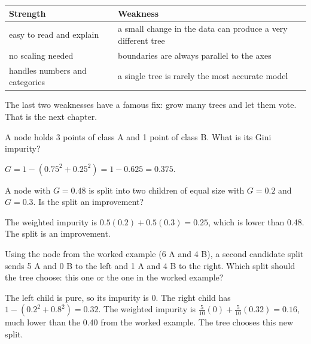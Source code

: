 \begin{center}
\begin{tabular}{>{\raggedright\arraybackslash}p{4.4cm} >{\raggedright\arraybackslash}p{7.6cm}}
\textbf{Strength} & \textbf{Weakness} \\
\hline
easy to read and explain & a small change in the data can produce a very different tree \\
no scaling needed & boundaries are always parallel to the axes \\
handles numbers and categories & a single tree is rarely the most accurate model \\
\end{tabular}
\end{center}

The last two weaknesses have a famous fix: grow many trees and let them vote. That is the next chapter.

\begin{Exercise}[label=dt1, title=Compute impurity]
A node holds 3 points of class A and 1 point of class B. What is its Gini impurity?
\end{Exercise}
\begin{Answer}[ref=dt1]
$G = 1 - (0.75^2 + 0.25^2) = 1 - 0.625 = 0.375$.
\end{Answer}

\begin{Exercise}[label=dt2, title=Is the split better?]
A node with $G = 0.48$ is split into two children of equal size with $G = 0.2$ and $G = 0.3$. Is the split an
improvement?
\end{Exercise}
\begin{Answer}[ref=dt2]
The weighted impurity is $0.5(0.2) + 0.5(0.3) = 0.25$, which is lower than 0.48. The split is an improvement.
\end{Answer}

\begin{Exercise}[label=dt3, title=Pick the better split, space=3cm]
Using the node from the worked example (6 A and 4 B), a second candidate split sends 5 A and 0 B to the left and
1 A and 4 B to the right. Which split should the tree choose: this one or the one in the worked example?
\end{Exercise}
\begin{Answer}[ref=dt3]
The left child is pure, so its impurity is 0. The right child has $1 - (0.2^2 + 0.8^2) = 0.32$. The weighted
impurity is $\frac{5}{10}(0) + \frac{5}{10}(0.32) = 0.16$, much lower than the 0.40 from the worked example. The
tree chooses this new split.
\end{Answer}

